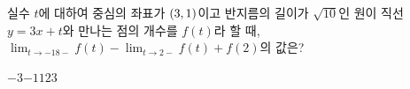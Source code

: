 실수 $t$에 대하여 중심의 좌표가 $(3{,}\mkern3mu\mathopen{}1)$이고 반지름의 길이가 $\sqrt{10}$인 원이 직선 $y=3x+t$와 만나는 점의 개수를 $f(t)$라 할 때, $\displaystyle\lim_{t\to -18-} f(t)-\lim_{t\to 2-} f(t)+f(2)$의 값은?
\begin{choices32}{$-3$}{$-1$}{$1$}{$2$}{$3$}\end{choices32}
